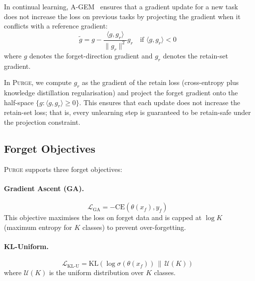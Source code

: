 \documentclass[10pt,twocolumn]{article}
\newcommand{\ours}{\textsc{Purge}}
\begin{document}
In continual learning, A-GEM~\cite{chaudhry2019agem} ensures that a gradient update for a new task does not increase the loss on previous tasks by projecting the gradient when it conflicts with a reference gradient:
\begin{equation}\label{eq:projection}
\tilde{g} = g - \frac{\langle g, g_r \rangle}{\|g_r\|^2} g_r \quad \text{if } \langle g, g_r \rangle < 0
\end{equation}
where $g$ denotes the forget-direction gradient and $g_r$ denotes the retain-set gradient.

In \ours{}, we compute $g_r$ as the gradient of the retain loss (cross-entropy plus knowledge distillation regularisation) and project the forget gradient onto the half-space $\{g : \langle g, g_r \rangle \geq 0\}$.
This ensures that each update does not increase the retain-set loss; that is, every unlearning step is guaranteed to be retain-safe under the projection constraint.

\subsection{Forget Objectives}

\ours{} supports three forget objectives:

\paragraph{Gradient Ascent (GA).}
\begin{equation}
\mathcal{L}_{\text{GA}} = -\text{CE}(\theta(x_f), y_f)
\end{equation}
This objective maximises the loss on forget data and is capped at $\log K$ (maximum entropy for $K$ classes) to prevent over-forgetting.

\paragraph{KL-Uniform.}
\begin{equation}
\mathcal{L}_{\text{KL-U}} = \text{KL}\!\left(\log\sigma(\theta(x_f)) \,\|\, \mathcal{U}(K)\right)
\end{equation}
where $\mathcal{U}(K)$ is the uniform distribution over $K$ classes.
\end{document}
